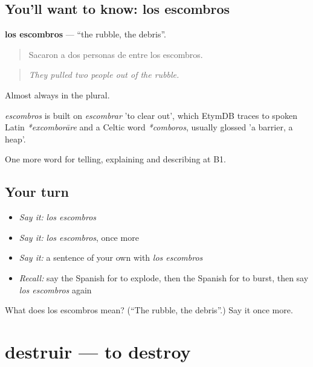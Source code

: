 \subsection*{You'll want to know: los escombros}
\textbf{los escombros} — \textquotedblleft{}the rubble, the debris\textquotedblright{}.

\begin{quote}
Sacaron a dos personas de entre los escombros.
\end{quote}

\begin{quote}
\emph{They pulled two people out of the rubble.}
\end{quote}

Almost always in the plural.

\begin{cousinweb}
\emph{escombros} is built on \emph{escombrar} 'to clear out', which EtymDB traces to spoken Latin \emph{*excomborāre} and a Celtic word \emph{*comboros}, usually glossed 'a barrier, a heap'.
\end{cousinweb}

\begin{grammarlens}[title={What you've built}]
One more word for telling, explaining and describing at B1.
\end{grammarlens}

\subsection*{Your turn}
\begin{itemize}
\raggedright
  \item \emph{Say it:} \emph{los escombros}
  \item \emph{Say it:} \emph{los escombros}, once more
  \item \emph{Say it:} a sentence of your own with \emph{los escombros}
  \item \emph{Recall:} say the Spanish for to explode, then the Spanish for to burst, then say \emph{los escombros} again
\end{itemize}

\begin{tcolorbox}[breakable,colback=teal!4,colframe=teal!35!black,title={Before you move on}]
What does los escombros mean? (\textquotedblleft{}The rubble, the debris\textquotedblright{}.) Say it once more.
\end{tcolorbox}
\section[destruir]{destruir — to destroy}

